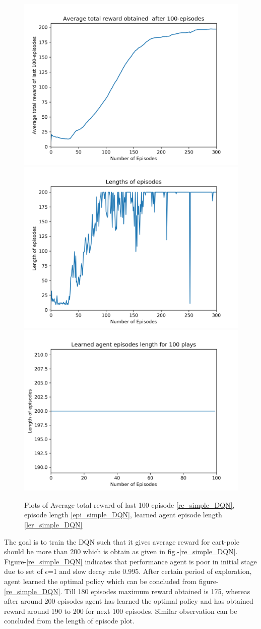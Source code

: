 \documentclass[preprint,12pt]{elsarticle}
\begin{document}
  \begin{figure}[H]
  	\centering  
  	\subfigure
  	{\includegraphics[width=0.4\linewidth]{./Avg_rewards.png}\label{re_simple_DQN}}
  	\subfigure
 	{\includegraphics[width=0.4\linewidth]{./Episode_lengths.png}\label{epi_simple_DQN}}
  	\subfigure
	{\includegraphics[width=0.4\linewidth]{./Learned_Episode_lengths.png}\label{ler_simple_DQN}}
  	\caption{Plots of Average total reward of last 100 episode \ref{re_simple_DQN}, episode length \ref{epi_simple_DQN}, learned agent episode length \ref{ler_simple_DQN}}
  	\label{fig:simple}
  \end{figure}
  
  The goal is to train the DQN such that it gives average reward for cart-pole should be more than 200 which is obtain as given in fig.-\ref{re_simple_DQN}. Figure-\ref{re_simple_DQN} indicates that performance agent is poor in initial stage due to set of $\epsilon$=1 and slow decay rate 0.995. After certain period of exploration, agent learned the optimal policy which can be concluded from figure-\ref{re_simple_DQN}. Till 180 episodes maximum reward obtained is 175, whereas after around 200 episodes agent has learned the optimal policy and has obtained reward around 190 to 200 for next 100 episodes. Similar observation can be concluded from the length of episode plot. 
  
\end{document}
